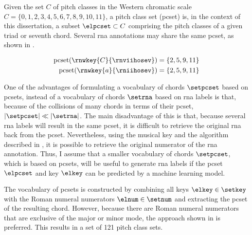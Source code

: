 
Given the set $C$ of pitch classes in the Western chromatic
scale $C = \{0, 1, 2, 3, 4, 5, 6, 7, 8, 9, 10, 11 \}$, a
pitch class set (\gls{pcset}) is, in the context of this
dissertation, a subset $\elpcset \subset C$ comprising the
pitch classes of a given triad or seventh chord. Several
\gls{rna} annotations may share the same \gls{pcset}, as
shown in .

\begin{equation}
    \label{eq:pcset_collision}
    \begin{split}
        \text{pcset}(\rnwkey{C}{\rnviihosev}) &= \{2, 5, 9, 11 \}\\
        \text{pcset}(\rnwkey{a}{\rniihosev}) &= \{2, 5, 9, 11 \}
    \end{split}
\end{equation}

One of the advantages of formulating a vocabulary of chords
$\setpcset$ based on \gls{pcset}s, instead of a vocabulary
of chords $\setrna$ based on \gls{rna} labels is that,
because of the collisions of many chords in terms of their
\gls{pcset}, $| \setpcset | \ll | \setrna |$. The main
disadvantage of this is that, because several \gls{rna}
labels will result in the same \gls{pcset}, it is difficult
to retrieve the original \gls{rna} back from the
\gls{pcset}. Nevertheless, using the musical key and the
algorithm described in
,
it is possible to retrieve the original numerator of the
\gls{rna} annotation. Thus, I assume that a smaller
vocabulary of chords $\setpcset$, which is based on
\gls{pcset}s, will be useful to generate \gls{rna} labels if
the \gls{pcset} $\elpcset$ and key $\elkey$ can be predicted
by a machine learning model.

The vocabulary of \gls{pcset}s is constructed by combining
all keys $\elkey \in \setkey$ with the Roman numeral
numerators $\elnum \in \setnum$ and extracting the
\gls{pcset} of the resulting chord. However, because there
are Roman numeral numerators that are exclusive of the major
or minor mode, the approach shown in  is
preferred. This results in a set of 121 pitch class sets.


